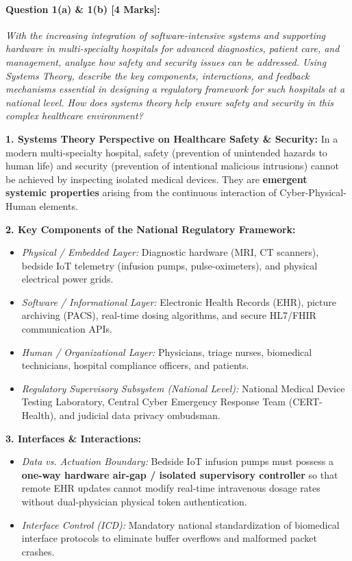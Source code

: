 \paragraph{Question 1(a) \& 1(b) [4 Marks]:}
\textit{With the increasing integration of software-intensive systems and supporting hardware in multi-specialty hospitals for advanced diagnostics, patient care, and management, analyze how safety and security issues can be addressed. Using Systems Theory, describe the key components, interactions, and feedback mechanisms essential in designing a regulatory framework for such hospitals at a national level. How does systems theory help ensure safety and security in this complex healthcare environment?}

\begin{tcolorbox}[colback=white,colframe=seSecondary,title={\small \textbf{Model Solution for Q1 (W24 Midsem):}}]
\textbf{1. Systems Theory Perspective on Healthcare Safety \& Security:}
In a modern multi-specialty hospital, safety (prevention of unintended hazards to human life) and security (prevention of intentional malicious intrusions) cannot be achieved by inspecting isolated medical devices. They are \textbf{emergent systemic properties} arising from the continuous interaction of Cyber-Physical-Human elements. 

\textbf{2. Key Components of the National Regulatory Framework:}
\begin{itemize}[leftmargin=1.5em, itemsep=1pt]
    \item \textit{Physical / Embedded Layer:} Diagnostic hardware (MRI, CT scanners), bedside IoT telemetry (infusion pumps, pulse-oximeters), and physical electrical power grids.
    \item \textit{Software / Informational Layer:} Electronic Health Records (EHR), picture archiving (PACS), real-time dosing algorithms, and secure HL7/FHIR communication APIs.
    \item \textit{Human / Organizational Layer:} Physicians, triage nurses, biomedical technicians, hospital compliance officers, and patients.
    \item \textit{Regulatory Supervisory Subsystem (National Level):} National Medical Device Testing Laboratory, Central Cyber Emergency Response Team (CERT-Health), and judicial data privacy ombudsman.
\end{itemize}

\textbf{3. Interfaces \& Interactions:}
\begin{itemize}[leftmargin=1.5em, itemsep=1pt]
    \item \textit{Data vs. Actuation Boundary:} Bedside IoT infusion pumps must possess a \textbf{one-way hardware air-gap / isolated supervisory controller} so that remote EHR updates cannot modify real-time intravenous dosage rates without dual-physician physical token authentication.
    \item \textit{Interface Control (ICD):} Mandatory national standardization of biomedical interface protocols to eliminate buffer overflows and malformed packet crashes.
\end{itemize}


\end{tcolorbox}
